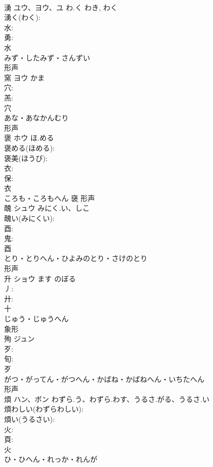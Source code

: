 \documentclass[8pt]{extreport}
\begin{document}
\begin{CJK}{UTF8}{min}
\\	湧	ユウ、ヨウ、ユ	わ.く	わき, わく	
\\	湧く(わく): 
\\	水: 
\\	勇: 
\\	水	
\\	みず・したみず・さんずい	
\\	形声 
\\	窯	ヨウ	かま		
\\	穴: 
\\	羔: 
\\	穴	
\\	あな・あなかんむり	
\\	形声 
\\	褒	ホウ	ほ.める		
\\	褒める(ほめる): 
\\	褒美(ほうび): 
\\	衣: 
\\	保: 
\\	衣	
\\	ころも・ころもへん	襃	形声 
\\	醜	シュウ	みにく.い、しこ		
\\	醜い(みにくい): 
\\	酉: 
\\	鬼: 
\\	酉	
\\	とり・とりへん・ひよみのとり・さけのとり	
\\	形声 
\\	升	ショウ	ます	のぼる	
\\	丿: 
\\	廾: 
\\	十	
\\	じゅう・じゅうへん	
\\	象形 
\\	殉	ジュン			
\\	歹: 
\\	旬: 
\\	歹	
\\	がつ・がってん・がつへん・かばね・かばねへん・いちたへん	
\\	形声 
\\	煩	ハン、ボン	わずら.う、わずら.わす、うるさ.がる、うるさ.い		
\\	煩わしい(わずらわしい): 
\\	煩い(うるさい): 
\\	火: 
\\	頁: 
\\	火	
\\	ひ・ひへん・れっか・れんが	

\end{CJK}
\end{document}
